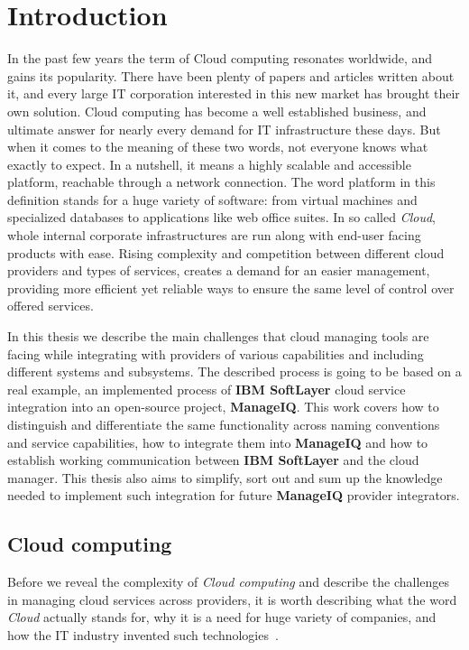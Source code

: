 
\chapter{Introduction}
\label{chap:Introduction}
In the past few years the term of Cloud computing resonates worldwide, and gains its popularity. There have been plenty of papers and articles written about it, and every large IT corporation interested in this new market has brought their own solution. Cloud computing has become a well established business, and ultimate answer for nearly every demand for IT infrastructure these days. But when it comes to the meaning of these two words, not everyone knows what exactly to expect. In a nutshell, it means a highly scalable and accessible platform, reachable through a network connection. The word platform in this definition stands for a huge variety of software: from virtual machines and specialized databases to applications like web office suites. In so called \emph{Cloud}, whole internal corporate infrastructures are run along with end-user facing products with ease. Rising complexity and competition between different cloud providers and types of services, creates a demand for an easier management, providing more efficient yet reliable ways to ensure the same level of control over offered services.

In this thesis we describe the main challenges that cloud managing tools are facing while integrating with providers of various capabilities and including different systems and subsystems. The described process is going to be based on a real example, an implemented process of \textbf{IBM SoftLayer} cloud service integration into an open-source project, \textbf{ManageIQ}. This work covers how to distinguish and differentiate the same functionality across naming conventions and service capabilities, how to integrate them into \textbf{ManageIQ} and how to establish working communication between \textbf{IBM SoftLayer} and the cloud manager. This thesis also aims to simplify, sort out and sum up the knowledge needed to implement such integration for future \textbf{ManageIQ} provider integrators.

\section{Cloud computing}
\label{sec:Cloud computing}
Before we reveal the complexity of \emph{Cloud computing} and describe the challenges in managing cloud services across providers, it is worth describing what the word \emph{Cloud} actually stands for, why it is a need for huge variety of companies, and how the IT industry invented such technologies~\cite{cervone}.

